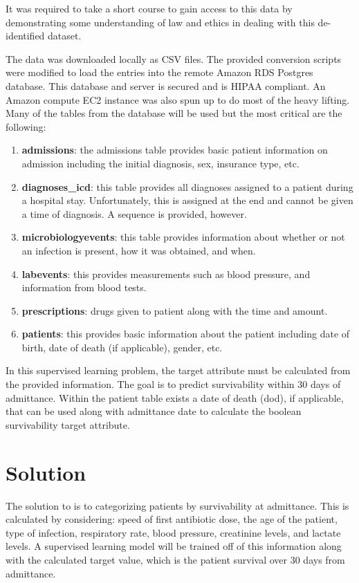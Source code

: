 \documentclass[11pt]{article}
\begin{document}
It was required to take a short course to gain access to this data by demonstrating some understanding of law and ethics in dealing with this de-identified dataset.

The data was downloaded locally as CSV files. The provided conversion scripts were modified to load the entries into the remote Amazon RDS Postgres database. This database and server is secured and is HIPAA compliant. An Amazon compute EC2 instance was also spun up to do most of the heavy lifting. Many of the tables from the database will be used but the most critical are the following:
\begin{enumerate}
\item \textbf{admissions}: the admissions table provides basic patient information on admission including the initial diagnosis, sex, insurance type, etc.
\item \textbf{diagnoses\_icd}: this table provides all diagnoses assigned to a patient during a hospital stay. Unfortunately, this is assigned at the end and cannot be given a time of diagnosis. A sequence is provided, however.
\item \textbf{microbiologyevents}: this table provides information about whether or not an infection is present, how it was obtained, and when.
\item \textbf{labevents}: this provides measurements such as blood pressure, and information from blood tests.
\item \textbf{prescriptions}: drugs given to patient along with the time and amount.
\item \textbf{patients}: this provides basic information about the patient including date of birth, date of death (if applicable), gender, etc.
\end{enumerate}

In this supervised learning problem, the target attribute must be calculated from the provided information. The goal is to predict survivability within 30 days of admittance. Within the patient table exists a date of death (dod), if applicable, that can be used along with admittance date to calculate the boolean survivability target attribute.


\section{Solution}
The solution to is to categorizing patients by survivability at admittance. This is calculated by considering: speed of first antibiotic dose, the age of the patient, type of infection, respiratory rate, blood pressure, creatinine levels, and lactate levels. A supervised learning model will be trained off of this information along with the calculated target value, which is the patient survival over 30 days from admittance.
\end{document}
